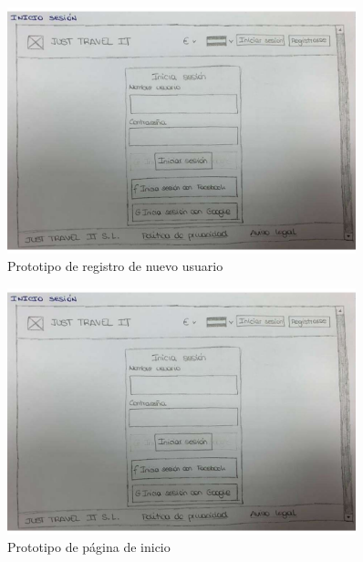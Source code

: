\begin{figure}[H]
    \centering
    \includegraphics[page=2, width=0.9\textwidth]{./Imagenes/Prototipo/Prototipos definitivos - Iteracion I.pdf}
    \caption{Prototipo de registro de nuevo usuario}
    \label{fig:prot_reg}
\end{figure}

\begin{figure}[H]
    \centering
    \includegraphics[page=3, width=0.9\textwidth]{./Imagenes/Prototipo/Prototipos definitivos - Iteracion I.pdf}
    \caption{Prototipo de página de inicio}
    \label{fig:prot_inicio}
\end{figure}

